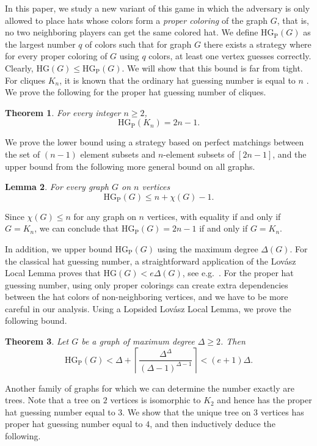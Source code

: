 \documentclass[a4paper,11pt]{amsproc}
\theoremstyle{plain}
\newtheorem{Theorem} {Theorem} [section]
\newtheorem{Lemma} [Theorem] {Lemma}
\theoremstyle{definition}
\newcommand{\HG}{{\mathrm{HG}}}
\newcommand{\HGP}{\mathrm{HG_{P}}}
\begin{document}
In this paper, we study a new variant of this game in which the adversary is only allowed to place hats whose colors form a \textit{proper coloring} of the graph $G$, that is, no two neighboring players can get the same colored hat. 
We define $\HGP(G)$ as the largest number $q$ of colors such that for graph $G$ there exists a strategy where for every proper coloring of $G$ using $q$ colors, at least one vertex guesses correctly. 
Clearly, $\HG(G) \leq \HGP(G)$.
We will show that this bound is far from tight. 
For cliques $K_n$, it is known that the ordinary hat guessing number is equal to $n$ \cite{Feige2004}.
We prove the following for the proper hat guessing number of cliques. 

\begin{Theorem}\label{Thm:CompleteGraphs}
 For every integer $n \geq 2$,
 \[\HGP(K_n) = 2n - 1.\]
\end{Theorem}

We prove the lower bound using a strategy based on perfect matchings between the set of $(n - 1)$ element subsets and $n$-element subsets of $[2n - 1]$, and the upper bound from the following more general bound on all graphs. 


\begin{Lemma}\label{Lem:ChromaticNumber}
    For every graph $G$ on $n$ vertices 
    \[\HGP(G) \leq n + \chi(G) - 1.\]
\end{Lemma}

Since $\chi(G) \leq n$ for any graph on $n$ vertices, with equality if and only if $G = K_n$, we can conclude that $\HGP(G) = 2n - 1$ if and only if $G = K_n$.

In addition, we upper bound $\HGP(G)$ using the maximum degree $\Delta(G)$.
For the classical hat guessing number, a straightforward application of the Lov\'asz Local Lemma proves that $\HG(G) < e \Delta(G)$, see e.g.\ \cite[Theorem 1.5]{Alon2020}.
For the proper hat guessing number, using only proper colorings can create extra dependencies between the hat colors of non-neighboring vertices, and we have to be more careful in our analysis.
Using a Lopsided Lov\'asz Local Lemma, we prove the following bound.

\begin{Theorem}
\label{thm:HGPlinear}
Let $G$ be a graph of maximum degree $\Delta\ge 2$.  Then
$$ \HGP(G) < \Delta+ \left\lceil \frac{\Delta^\Delta}{(\Delta-1)^{\Delta-1}}\right\rceil  <(e+1)\Delta.$$
\end{Theorem}


Another family of graphs for which we can determine the number exactly are trees. 
Note that a tree on $2$ vertices is isomorphic to $K_2$ and hence has the proper hat guessing number equal to $3$. 
We show that the unique tree on $3$ vertices has proper hat guessing number equal to $4$, and then inductively deduce the following.
\end{document}
